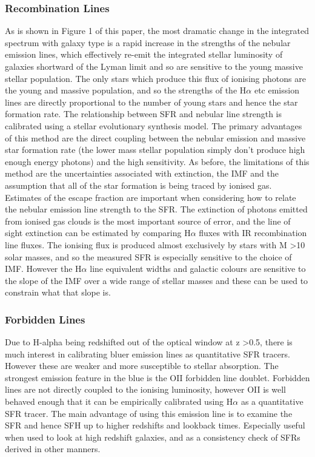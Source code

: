 \documentclass{literature}
\begin{document}
\subsubsection{Recombination Lines}
As is shown in Figure 1 of this paper, the most dramatic change in the integrated spectrum with galaxy type is a rapid increase in the strengths of the nebular emission lines, which effectively re-emit the integrated stellar luminosity of galaxies shortward of the Lyman limit and so are sensitive to the young massive stellar population. The only stars which produce this flux of ionising photons are the young and massive population, and so the strengths of the H$\alpha$ etc emission lines are directly proportional to the number of young stars and hence the star formation rate. The relationship between SFR and nebular line strength is calibrated using a stellar evolutionary synthesis model. The primary advantages of this method are the direct coupling between the nebular emission and massive star formation rate (the lower mass stellar population simply don't produce high enough energy photons) and the high sensitivity. As before, the limitations of this method are the uncertainties associated with extinction, the IMF and the assumption that all of the star formation is being traced by ionised gas. Estimates of the escape fraction are important when considering how to relate the nebular emission line strength to the SFR. The extinction of photons emitted from ionised gas clouds is the most important source of error, and the line of sight extinction can be estimated by comparing H$\alpha$ fluxes with IR recombination line fluxes. The ionising flux is produced almost exclusively by stars with M \textgreater 10 solar masses, and so the measured SFR is especially sensitive to the choice of IMF. However the H$\alpha$ line equivalent widths and galactic colours are sensitive to the slope of the IMF over a wide range of stellar masses and these can be used to constrain what that slope is. 
\subsubsection{Forbidden Lines}
Due to H-alpha being redshifted out of the optical window at z \textgreater 0.5, there is much interest in calibrating bluer emission lines as quantitative SFR tracers. However these are weaker and more susceptible to stellar absorption. The strongest emission feature in the blue is the OII forbidden line doublet. Forbidden lines are not directly coupled to the ionising luminosity, however OII is well behaved enough that it can be empirically calibrated using H$\alpha$ as a quantitative SFR tracer. The main advantage of using this emission line is to examine the SFR and hence SFH up to higher redshifts and lookback times. Especially useful when used to look at high redshift galaxies, and as a consistency check of SFRs derived in other manners.
\end{document}
